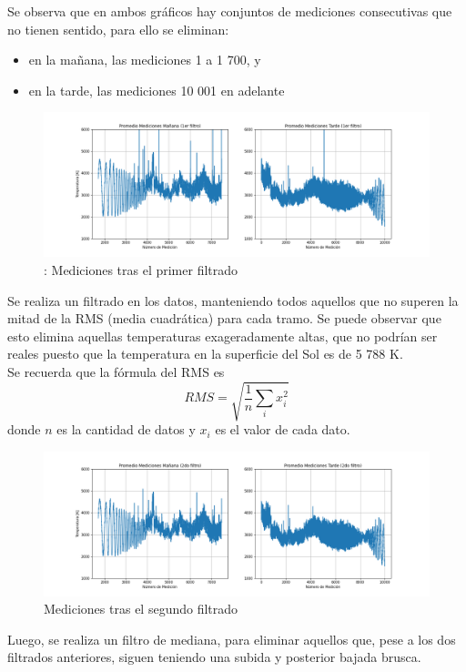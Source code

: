 Se observa que en ambos gráficos hay conjuntos de mediciones consecutivas que no tienen sentido, para ello se eliminan:
\begin{itemize}
    \item en la mañana, las mediciones 1 a 1 700, y
    \item en la tarde, las mediciones 10 001 en adelante
\end{itemize}
\begin{figure}[H]
\centering
\includegraphics[scale=0.4]{img/img/inf4graf3.png}
\caption{\label{fig:Grafico}: Mediciones tras el primer filtrado}
\end{figure}
Se realiza un filtrado en los datos, manteniendo todos aquellos que no superen la mitad de la RMS (media cuadrática) para cada tramo. Se puede observar que esto elimina aquellas temperaturas exageradamente altas, que no podrían ser reales puesto que la temperatura en la superficie del Sol es de 5 788 K.\\
Se recuerda que la fórmula del RMS es
$$RMS=\sqrt{\frac{1}{n}\sum\limits_i x_i^2}$$
donde $n$ es la cantidad de datos y $x_i$ es el valor de cada dato.
\begin{figure}[H]
\centering
\includegraphics[scale=0.4]{img/img/inf4graf4.png}
\caption{\label{fig:Grafico} Mediciones tras el segundo filtrado}
\end{figure}
Luego, se realiza un filtro de mediana, para eliminar aquellos que, pese a los dos filtrados anteriores, siguen teniendo una subida y posterior bajada brusca.\\
